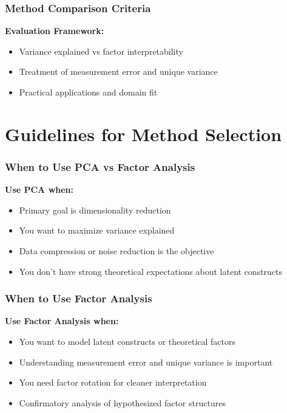 \documentclass[aspectratio=169]{beamer}
\begin{document}
\begin{frame}
    \frametitle{Method Comparison Criteria}
    \textbf{Evaluation Framework:}
    \begin{itemize}
        \item Variance explained vs factor interpretability
        \item Treatment of measurement error and unique variance
        \item Practical applications and domain fit
    \end{itemize}
\end{frame}

\section{Guidelines for Method Selection}

\begin{frame}
    \frametitle{When to Use PCA vs Factor Analysis}
    \textbf{Use PCA when:}
    \begin{itemize}
        \item Primary goal is dimensionality reduction \pause
        \item You want to maximize variance explained \pause
        \item Data compression or noise reduction is the objective \pause
        \item You don't have strong theoretical expectations about latent constructs \pause
    \end{itemize}
\end{frame}

\begin{frame}
    \frametitle{When to Use Factor Analysis}
    \textbf{Use Factor Analysis when:}
    \begin{itemize}
        \item You want to model latent constructs or theoretical factors \pause
        \item Understanding measurement error and unique variance is important \pause
        \item You need factor rotation for cleaner interpretation \pause
        \item Confirmatory analysis of hypothesized factor structures \pause
    \end{itemize}
\end{frame}
\end{document}
